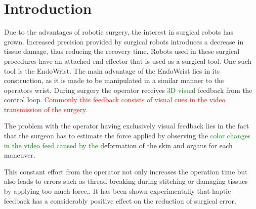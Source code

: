 \section{Introduction}\label{sec:introduction}
{}
Due to the advantages of robotic surgery, the interest in surgical robots has grown\cite{forbes}.
Increased precision provided by surgical robots introduces a decrease in tissue damage, thus reducing the recovery time\cite{RIGSP}.
Robots used in these surgical procedures have an attached end-effector that is used as a surgical tool.
One such tool is the EndoWrist.
The main advantage of the EndoWrist lies in its construction, as it is made to be manipulated in a similar manner to the operators wrist.
During surgery the operator receives \textcolor{green}{3D visual} feedback from the control loop. \textcolor{red}{Commonly this feedback consists of visual cues in the video transmission of the surgery.}


The problem with the operator having exclusively visual feedback lies in the fact that the surgeon has to estimate the force applied by observing the \textcolor{green}{color changes in the video feed caused by the } deformation  of the skin and organs for each maneuver.



This constant effort from the operator not only increases the operation time but also leads to errors such as thread breaking during stitching or damaging tissues by applying too much force,\cite{lee2015grip}. It has been shown experimentally that haptic feedback has a considerably positive effect on the reduction of surgical error\cite{EOFGFF}.


